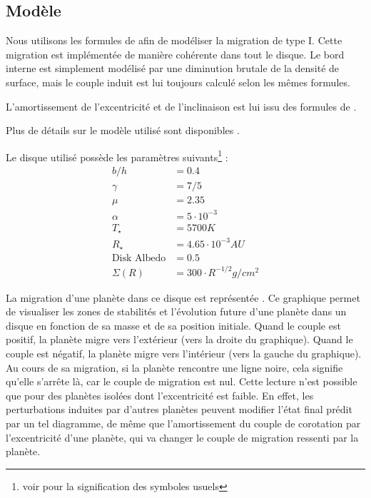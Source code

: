 \subsection{Modèle}
Nous utilisons les formules de \cite{paardekooper2011torque} afin de modéliser la migration de type I. Cette migration est implémentée de manière cohérente dans tout le disque. Le bord interne est simplement modélisé par une diminution brutale de la densité de surface, mais le couple induit est lui toujours calculé selon les mêmes formules. 

L'amortissement de l'excentricité et de l'inclinaison est lui issu des formules de \cite{cresswell2008three}. 

Plus de détails sur le modèle utilisé sont disponibles .

Le disque utilisé possède les paramètres suivants\footnote{voir  pour la signification des symboles usuels} : 
\begin{align*}
b/h &= 0.4\\
\gamma &= 7/5\\
\mu &= 2.35\\
\alpha &= 5\cdot 10^{-3}\\
T_\star &= 5700\unit{K}\\
R_\star &= 4.65\cdot 10^{-3}\unit{AU}\\
\text{Disk Albedo} &= 0.5\\
\Sigma(R) &= 300 \cdot R^{-1/2}\unit{g/cm^2}
\end{align*}

La migration d'une planète dans ce disque est représentée . Ce graphique permet de visualiser les
zones de stabilités et l'évolution future d'une planète dans un disque en fonction de sa masse et de sa position initiale. Quand
le couple est positif, la planète migre vers l'extérieur (vers la droite du graphique). Quand le couple est négatif, la planète
migre vers l'intérieur (vers la gauche du graphique). Au cours de sa migration, si la planète rencontre une ligne noire, cela
signifie qu'elle s'arrête là, car le couple de migration est nul. Cette lecture n'est possible que pour des planètes isolées
dont l'excentricité est faible. En effet, les perturbations induites par d'autres planètes peuvent modifier l'état final prédit
par un tel diagramme, de même que l'amortissement du couple de corotation par l'excentricité d'une planète, qui va changer
le couple de migration ressenti par la planète. 

